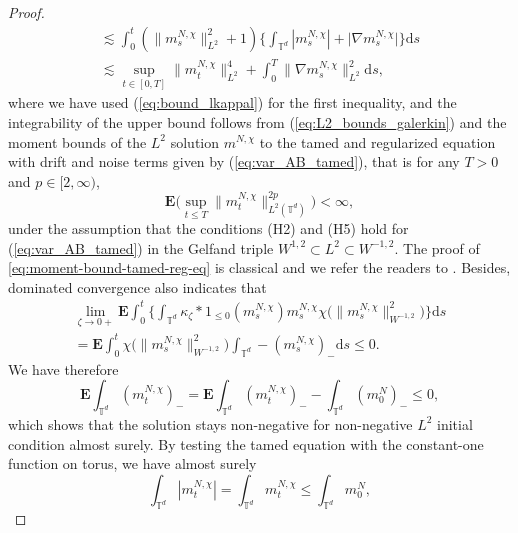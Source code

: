 \begin{proof}
\begin{align*}
\lesssim\int_0^t  (\|m_s^{N,\chi}\|_{L^2}^2 + 1)\Big\{\int_{\mathbb{T}^d}  |m_s^{N,\chi}| +  \big|\nabla m_s^{N,\chi} \big| \Big\} \mathrm{d}s \\
\lesssim \sup_{t \in [0,T]} \|m_t^{N,\chi}\|^4_{L^2} + \int_0^T \|\nabla m^{N,\chi}_s\|_{L^2}^2\mathrm{d}s, 
\end{align*}
where we have used (\ref{eq:bound_lkappal}) for the first inequality, and the integrability of the upper bound follows from (\ref{eq:L2_bounds_galerkin}) and the moment bounds of the $L^2$ solution $m^{N,\chi}$ to the tamed and regularized equation with drift and noise terms given by (\ref{eq:var_AB_tamed}), that is for any $T >0$ and $p \in [2,\infty)$, 
\begin{equation}\label{eq:moment-bound-tamed-reg-eq}
    \mathbf{E} \Big(\sup_{t\leq T}\|m^{N,\chi}_t\|^{2p}_{L^2(\mathbb{T}^d)}\Big) < \infty,
\end{equation}
under the assumption that the conditions (H2) and (H5) hold for (\ref{eq:var_AB_tamed}) in the Gelfand triple $W^{1,2} \subset L^2 \subset W^{-1,2}$. The proof of \eqref{eq:moment-bound-tamed-reg-eq} is classical and we refer the readers to \cite[Appendix A.2]{djurdjevac2025weak}. Besides, dominated convergence also indicates that
\begin{equation}\label{eq:taming_positivity}
\begin{split}
\lim_{\zeta \to 0+}\mathbf{E} \int_0^t\Big\{\int_{\mathbb{T}^d} \kappa_{\zeta}\ast \mathrm{1}_{\leq 0}(m_s^{N,\chi})  m_s^{N,\chi} \chi\big( \|m_s^{N,\chi}\|_{W^{-1,2}}^2\big) \Big\}\mathrm{d}s \\
= \mathbf{E} \int_0^t \chi\big( \|m_s^{N,\chi}\|_{W^{-1,2}}^2\big)\int_{\mathbb{T}^d} -(m_s^{N,\chi})_{-}  \mathrm{d}s \leq 0.
\end{split}
\end{equation}
We have therefore
\begin{equation}\label{eq:neg_tame_vanish}
\mathbf{E}  \int_{\mathbb{T}^d} (m^{N,\chi}_t)_{-}  = \mathbf{E}  \int_{\mathbb{T}^d} (m^{N,\chi}_t)_{-}  -  \int_{\mathbb{T}^d} (m^{N}_0)_{-}  \leq 0,
\end{equation}
which shows that the solution stays non-negative for non-negative $L^2$ initial condition almost surely. By testing the tamed equation with the constant-one function on torus, we have almost surely
\begin{equation}\label{eq:non-inc-tamed-solution}
    \int_{\mathbb{T}^d} |m_t^{N,\chi}| = \int_{\mathbb{T}^d} m_t^{N,\chi} \leq \int_{\mathbb{T}^d} m_0^{N},
\end{equation}

\end{proof}
